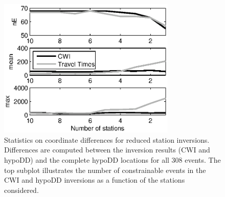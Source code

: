 \documentclass[draft,jgrga]{agutex}
\begin{document}
\begin{figure}
\noindent\includegraphics[width = 20pc]{diags/CalaverasLoc4.eps}
\caption{Statistics on coordinate differences for reduced station inversions. Differences
are computed between the inversion results (CWI and hypoDD) and the complete hypoDD
locations for all 308 events. The top subplot illustrates the number of constrainable
events in the CWI and hypoDD inversions as a function of the stations considered.}
\label{fig-statremoval_summarystats}
\end{figure}
\end{document}
